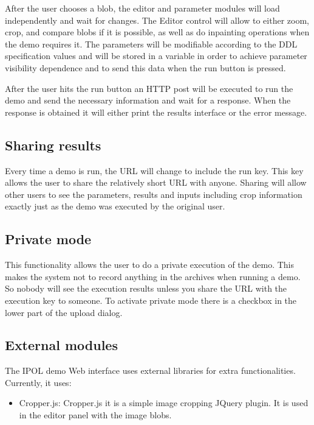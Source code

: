 After the user chooses a blob, the editor and parameter modules will load independently and wait for changes. The Editor control 
will allow to either zoom, crop, and compare blobs if it is possible, as well as do inpainting operations when the demo requires it. 
The parameters will be modifiable according to the DDL specification values and will be stored in a variable in order to achieve 
parameter visibility dependence and to send this data when the run button is pressed.

After the user hits the run button an HTTP post will be executed to run the demo and send the necessary information and wait for 
a response. When the response is obtained it will either print the results interface or the error message.


\subsection{Sharing results}
Every time a demo is run, the URL will change to include the run key. This key allows the user to share the relatively short URL 
with anyone. Sharing will allow other users to see the parameters, results and inputs including crop information exactly just as the 
demo was executed by the original user. 

\subsection{Private mode}
This functionality allows the user to do a private execution of the demo. This makes the system not to record anything in the archives when running 
a demo. So nobody will see the execution results unless you share the URL with the execution key to someone. To activate private 
mode there is a checkbox in the lower part of the upload dialog.

\subsection{External modules}

The IPOL demo Web interface uses external libraries for extra functionalities.
Currently, it uses:

\begin{itemize}
\item Cropper.js: Cropper.js it is a simple image cropping JQuery plugin. It is used in the editor panel with the image blobs.
\end{itemize}

